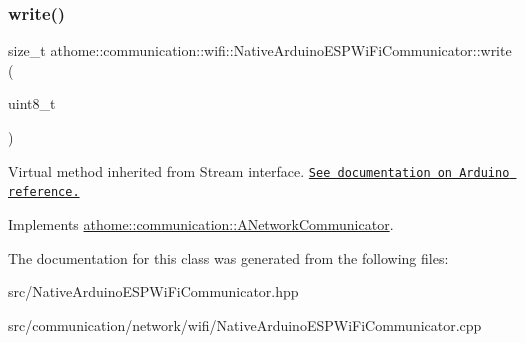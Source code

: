 \subsubsection{\texorpdfstring{write()}{write()}}
{\footnotesize\ttfamily size\+\_\+t athome\+::communication\+::wifi\+::\+Native\+Arduino\+E\+S\+P\+Wi\+Fi\+Communicator\+::write (\begin{DoxyParamCaption}\item[{uint8\+\_\+t}]{ }\end{DoxyParamCaption})\hspace{0.3cm}{\ttfamily [virtual]}}

Virtual method inherited from Stream interface. \href{https://www.arduino.cc/en/Serial/Write}{\tt See documentation on Arduino reference.} 

Implements \mbox{\hyperlink{classathome_1_1communication_1_1_a_network_communicator_a87adf68359a4ec5b0a38bea529ebf732}{athome\+::communication\+::\+A\+Network\+Communicator}}.



The documentation for this class was generated from the following files\+:\begin{DoxyCompactItemize}
\item 
src/Native\+Arduino\+E\+S\+P\+Wi\+Fi\+Communicator.\+hpp\item 
src/communication/network/wifi/Native\+Arduino\+E\+S\+P\+Wi\+Fi\+Communicator.\+cpp\end{DoxyCompactItemize}

